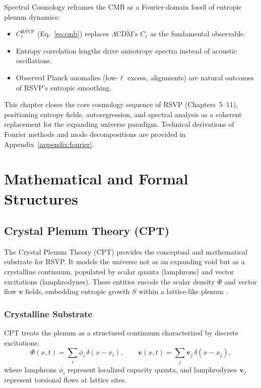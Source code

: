 \documentclass[12pt]{report}
\begin{document}
Spectral Cosmology reframes the CMB as a Fourier-domain fossil of entropic plenum dynamics:

\begin{itemize}
    \item $C_\ell^{\text{RSVP}}$ (Eq.~\ref{eq:cmb}) replaces $\Lambda$CDM’s $C_\ell$ as the fundamental observable.  
    \item Entropy correlation lengths drive anisotropy spectra instead of acoustic oscillations.  
    \item Observed Planck anomalies (low-$\ell$ excess, alignments) are natural outcomes of RSVP’s entropic smoothing.  
\end{itemize}

This chapter closes the core cosmology sequence of RSVP (Chapters~5--11), positioning entropy fields, autoregression, and spectral analysis as a coherent replacement for the expanding universe paradigm. Technical derivations of Fourier methods and mode decompositions are provided in Appendix~\ref{appendix:fourier}.

\part{Mathematical and Formal Structures}

\chapter{Crystal Plenum Theory (CPT)}

The Crystal Plenum Theory (CPT) provides the conceptual and mathematical substrate for RSVP. It models the universe not as an expanding void but as a crystalline continuum, populated by scalar quanta (lamphrons) and vector excitations (lamphrodynes). These entities encode the scalar density $\Phi$ and vector flow $\mathbf{v}$ fields, embedding entropic growth $S$ within a lattice-like plenum \citep{Flyxion2025}.

\section{Crystalline Substrate}

CPT treats the plenum as a structured continuum characterized by discrete excitations:
\begin{equation}
\Phi(x,t) = \sum_{i} \phi_i \, \delta(x-x_i), 
\qquad 
\mathbf{v}(x,t) = \sum_{j} \mathbf{v}_j \, \delta(x-x_j),
\end{equation}
where lamphrons $\phi_i$ represent localized capacity quanta, and lamphrodynes $\mathbf{v}_j$ represent torsional flows at lattice sites.
\end{document}
